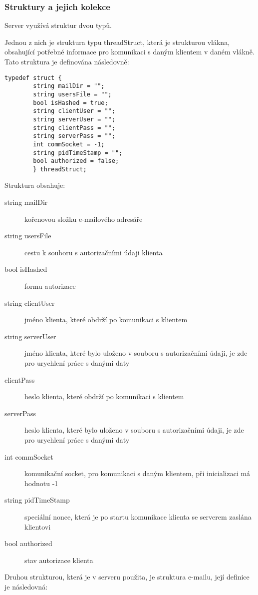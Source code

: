 \documentclass[11pt,a4paper]{report}
\begin{document}
    \subsubsection{Struktury a jejich kolekce}
    \label{subsec:threadstruct}
    Server využívá struktur dvou typů.\par
    Jednou z nich je struktura typu threadStruct, která je strukturou vlákna, obsahující potřebné informace pro komunikaci s daným klientem v daném vlákně. Tato struktura je definována následovně:
    \lstset{language=C++,frameround=fttt}
    \begin{lstlisting}[frame=trBL]
        typedef struct {
        string mailDir = "";
        string usersFile = "";
        bool isHashed = true;
        string clientUser = "";
        string serverUser = "";
        string clientPass = "";
        string serverPass = "";
        int commSocket = -1;
        string pidTimeStamp = "";
        bool authorized = false;
        } threadStruct;
    \end{lstlisting}
    Struktura obsahuje:
    \begin{description}
        \item [string mailDir] kořenovou složku e-mailového adresáře
        \item [string usersFile] cestu k souboru s autorizačními údaji klienta
        \item [bool isHashed] formu autorizace
        \item [string clientUser] jméno klienta, které obdrží po komunikaci s klientem
        \item [string serverUser] jméno klienta, které bylo uloženo v souboru s autorizačními údaji, je zde pro urychlení práce s danými daty
        \item [clientPass] heslo klienta, které obdrží po komunikaci s klientem
        \item [serverPass] heslo klienta, které bylo uloženo v souboru s autorizačními údaji, je zde pro urychlení práce s danými daty
        \item [int commSocket] komunikační socket, pro komunikaci s daným klientem, při inicializaci má hodnotu -1
        \item [string pidTimeStamp] speciální nonce, která je po startu komunikace klienta se serverem zaslána klientovi
        \item [bool authorized] stav autorizace klienta
    \end{description}
    \label{subsec:mailstruct}
    Druhou strukturou, která je v serveru použita, je struktura e-mailu, její definice je následovná:
\end{document}
